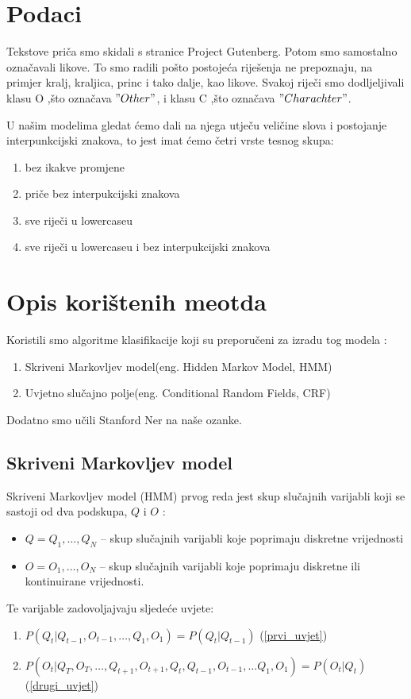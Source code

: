 \documentclass[conference]{IEEEtran}
\begin{document}
\section{Podaci}
Tekstove pri\v{c}a smo skidali s stranice Project Gutenberg. Potom smo samostalno ozna\v{c}avali likove. To smo radili po\v{s}to postoje\'ca rije\v{s}enja ne prepoznaju, na primjer kralj, kraljica, princ i tako dalje, kao likove. Svakoj rije\v{c}i smo dodljeljivali klasu O ,\v{s}to ozna\v{c}ava $"Other"$, i klasu C ,\v{s}to ozna\v{c}ava $"Charachter"$.

U na\v{s}im modelima gledat \'cemo dali na njega utje\v{c}u veli\v{c}ine slova i postojanje interpunkcijski znakova, to jest imat \'cemo \v{c}etri vrste tesnog skupa: 
\begin{enumerate}
\item bez ikakve promjene
\item pri\v{c}e bez interpukcijski znakova
\item sve rije\v{c}i u lowercaseu
\item sve rije\v{c}i u lowercaseu i bez interpukcijski znakova
\end{enumerate} 


\section{Opis kori\v{s}tenih meotda}
Koristili smo algoritme klasifikacije koji su preporu\v{c}eni za izradu tog modela :
\begin{enumerate}
\item Skriveni Markovljev model(eng. Hidden Markov Model, HMM)
\item Uvjetno slu\v{c}ajno polje(eng. Conditional Random Fields, CRF)
\end{enumerate}
Dodatno smo u\v{c}ili Stanford Ner na na\v{s}e ozanke.

\subsection{Skriveni Markovljev model}
Skriveni Markovljev model (HMM) prvog reda jest skup slu\v{c}ajnih varijabli koji se sastoji od dva podskupa, $Q$ i $O$ :
\begin{itemize}
\item $Q = Q_1, \ldots , Q_N$ -- skup slu\v{c}ajnih varijabli koje poprimaju diskretne vrijednosti
\item $O = O_1, \ldots , O_N$ -- skup slu\v{c}ajnih varijabli koje poprimaju diskretne ili kontinuirane vrijednosti.
\end{itemize}
Te varijable zadovoljajvaju sljede\'ce uvjete:
\begin{enumerate}
\item \label{prvi_uvjet} $P(Q_t|Q_{t-1},O_{t-1}, \ldots, Q_{1},O_{1}) = P ( Q_{t}|Q_{t-1})$ (\ref{prvi_uvjet})
\item \label{drugi_uvjet} $P(O_t|Q_T,O_T, \ldots, Q_{t+1},O_{t+1},Q_t,Q_{t-1},O_{t-1}, \ldots  Q_{1},O_{1}) = P ( O_{t}|Q_{t})$  (\ref{drugi_uvjet})
\end{enumerate}
\end{document}
